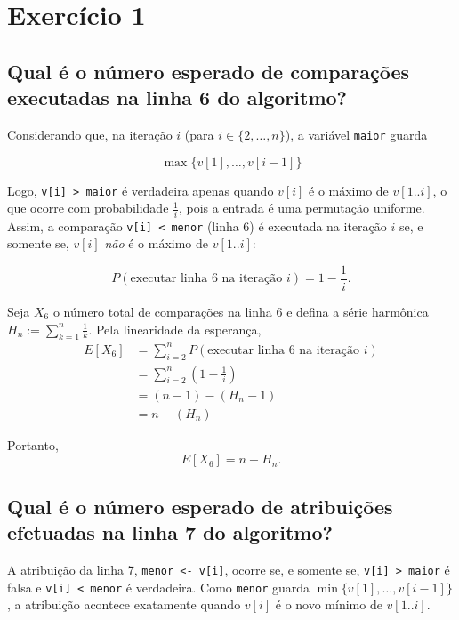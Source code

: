\documentclass[a4paper,12pt]{article}
\begin{document}
\section*{Exercício 1}

\subsection*{Qual é o número esperado de comparações executadas na linha 6 do algoritmo?}

Considerando que, na iteração $i$ (para $i \in \{2, \dots, n\}$), a variável \texttt{maior} guarda

\begin{equation}
\max\{v[1], \dots, v[i-1]\}
\end{equation}

Logo, \texttt{v[i] > maior} é verdadeira apenas quando $v[i]$ é o máximo de $v[1..i]$, o que ocorre com probabilidade $\tfrac{1}{i}$, pois a entrada é uma permutação uniforme.
Assim, a comparação \texttt{v[i] < menor} (linha 6) é executada na iteração $i$ se, e somente se, $v[i]$ \emph{não} é o máximo de $v[1..i]$:

\begin{equation}
P(\text{executar linha 6 na iteração } i) = 1 - \frac{1}{i}.
\end{equation}

Seja $X_6$ o número total de comparações na linha 6 e defina a série harmônica $H_n := \sum_{k=1}^{n} \tfrac{1}{k}$. Pela linearidade da esperança,
\begin{align}
E[X_6]
&= \sum_{i=2}^{n} P(\text{executar linha 6 na iteração } i) \\
&= \sum_{i=2}^{n} \left(1 - \frac{1}{i}\right) \\
&= (n-1) - (H_n - 1) \\
&= n - (H_n)
\end{align}

Portanto,
\begin{equation}
\boxed{E[X_6] = n - H_n}.
\end{equation}

\subsection*{Qual é o número esperado de atribuições efetuadas na linha 7 do algoritmo?}

A atribuição da linha 7, \texttt{menor <- v[i]}, ocorre se, e somente se, \texttt{v[i] > maior} é falsa e \texttt{v[i] < menor} é verdadeira. Como \texttt{menor} guarda $\min\{v[1], \dots, v[i-1]\}$, a atribuição acontece exatamente quando $v[i]$ é o novo mínimo de $v[1..i]$.
\end{document}
